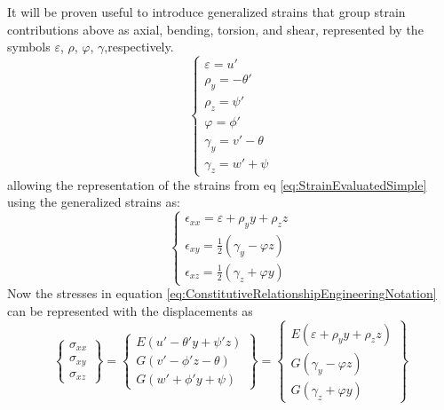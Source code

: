 It will be proven useful to introduce generalized strains that group strain contributions above as axial, bending, torsion, and shear, represented by the symbols $ \varepsilon $, $ \rho $, $ \varphi $, $ \gamma $,respectively.
\begin{equation}\label{eq:GeneralizedStrains}
\left\{\begin{array}{l}
\varepsilon=u'\\
\rho_{y}=-\theta'\\
\rho_{z}=\psi'\\
\varphi=\phi'\\
\gamma_{y}=v'-\theta\\
\gamma_{z}=w'+\psi\end{array}\right.
\end{equation}
allowing the representation of the strains from eq \ref{eq:StrainEvaluatedSimple} using the generalized strains as:
\begin{equation}\label{eq:StrainEvaluatedSimpleGeneralized}
\left\{\begin{array}{l}
\epsilon_{xx}=\varepsilon+\rho_yy+\rho_zz\\
\epsilon_{xy}=\frac{1}{2}(\gamma_y-\varphi z)\\
\epsilon_{xz}=\frac{1}{2}(\gamma_z+\varphi y)
\end{array}\right.
\end{equation}
Now the stresses in equation \ref{eq:ConstitutiveRelationshipEngineeringNotation} can be represented with the displacements as 
\begin{equation}\label{key}
\left\{\begin{array}{c}
\sigma_{xx}\\ \sigma_{xy}\\ \sigma_{xz}
\end{array}\right\} = \left\{\begin{array}{c}
E(u'-\theta'y+\psi'z)\\ G(v'-\phi'z-\theta)\\ G(w'+\phi'y+\psi)
\end{array}\right\} = \left\{\begin{array}{c}
E(\varepsilon+\rho_yy+\rho_zz)\\ G(\gamma_y-\varphi z)\\ G(\gamma_z+\varphi y)
\end{array}\right\}
\end{equation}
